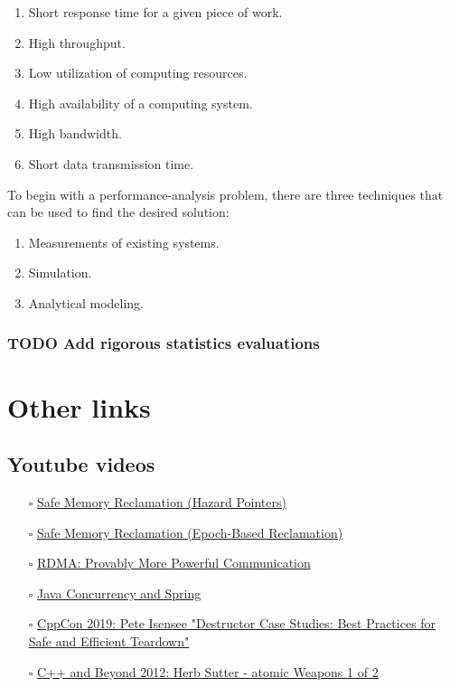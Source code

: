 \documentclass[openany, a4paper]{book}
\theoremstyle{break}
\theoremstyle{example}
\theoremstyle{note}
\theoremstyle{break}
\theoremstyle{exercise}
\begin{document}
\begin{enumerate}
\item Short response time for a given piece of work.
\item High throughput.
\item Low utilization of computing resources.
\item High availability of a computing system.
\item High bandwidth.
\item Short data transmission time.
\end{enumerate}

To begin with a performance-analysis problem, there are three techniques
that can be used to find the desired solution:

\begin{enumerate}
\item Measurements of existing systems.
\item Simulation.
\item Analytical modeling.
\end{enumerate}





\section{{\bfseries\sffamily TODO} Add rigorous statistics evaluations}
\label{sec:org5d0205d}


\part{Other links}
\label{sec:orgfd35ba9}

\chapter{Youtube videos}
\label{sec:org805b354}

\begin{itemize}
\item[{$\square$}] \href{https://www.youtube.com/watch?v=drXrIVfBKaQ}{Safe Memory Reclamation (Hazard Pointers)}
\item[{$\square$}] \href{https://www.youtube.com/watch?v=cYDMq5FOiw4}{Safe Memory Reclamation (Epoch-Based Reclamation)}
\item[{$\square$}] \href{https://www.microsoft.com/en-us/research/video/rdma-provably-more-powerful-communication/}{RDMA: Provably More Powerful Communication}
\item[{$\square$}] \href{https://www.youtube.com/watch?v=FYvoBi89wsE}{Java Concurrency and Spring}
\item[{$\square$}] \href{https://www.youtube.com/watch?v=XvWyLAW\_U0Q}{CppCon 2019: Pete Isensee "Destructor Case Studies: Best Practices for
Safe and Efficient Teardown"}
\item[{$\square$}] \href{https://www.youtube.com/watch?app=desktop\&v=A8eCGOqgvH4}{C++ and Beyond 2012: Herb Sutter - atomic Weapons 1 of 2}
\end{itemize}
\end{document}
